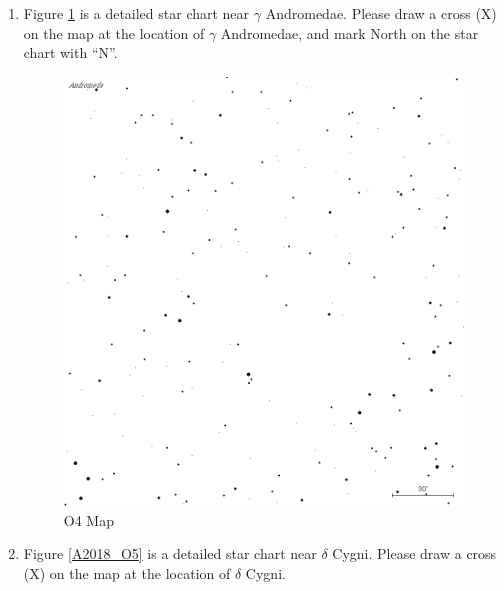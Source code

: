 \documentclass[a4paper,12pt]{extarticle}
\begin{document}
\begin{enumerate}
    \item Figure \ref{A2018_O4} is a detailed star chart near $\gamma$ Andromedae. Please draw a cross (X) on the map at the location of $\gamma$ Andromedae, and mark North on the star chart with “N”.
    
\begin{figure}[H]
    \centering
    \includegraphics[width=0.9\linewidth]{18_O4.png}
    \caption{O4 Map}
    \label{A2018_O4}
\end{figure}

\item Figure \ref{A2018_O5} is a detailed star chart near $\delta$ Cygni. Please draw a cross (X) on the map at the location of $\delta$ Cygni.


\end{enumerate}
\end{document}
